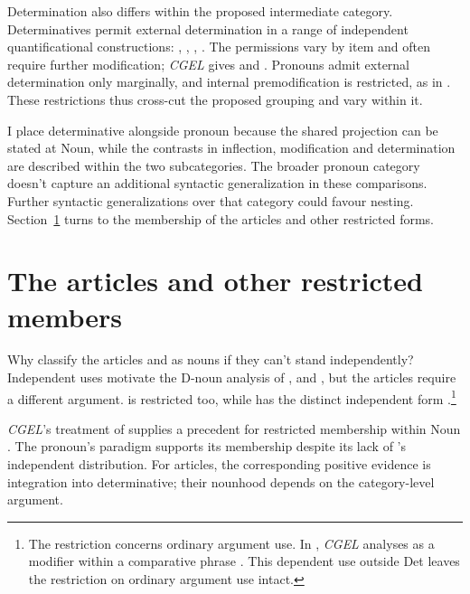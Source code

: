 \documentclass[12pt]{article}
\begin{document}
Determination also differs within the proposed intermediate category. Determinatives permit external determination in a range of independent quantificational constructions: , , , . The permissions vary by item and often require further modification; \textit{CGEL} gives  and  \citep[415--416]{huddleston2002}. Pronouns admit external determination only marginally, and internal premodification is restricted, as in  \citep[429--430]{huddleston2002}. These restrictions thus cross-cut the proposed grouping and vary within it.

I place determinative alongside pronoun because the shared projection can be stated at Noun, while the contrasts in inflection, modification and determination are described within the two subcategories. The broader pronoun category doesn't capture an additional syntactic generalization in these comparisons. Further syntactic generalizations over that category could favour nesting. Section~\ref{sec:articles} turns to the membership of the articles and other restricted forms.

\section{The articles and other restricted members}\label{sec:articles}

Why classify the articles  and  as nouns if they can't stand independently? Independent uses motivate the D-noun analysis of ,  and , but the articles require a different argument.  is restricted too, while  has the distinct independent form  \citep[371--372, 410--411]{huddleston2002}.\footnote{The restriction concerns ordinary argument use. In , \textit{CGEL} analyses  as a modifier within a comparative phrase \citep[1131--1132, 1135--1136]{huddleston2002}. This dependent use outside Det leaves the restriction on ordinary argument use intact.}

\textit{CGEL}'s treatment of  supplies a precedent for restricted membership within Noun \citep[470--471]{huddleston2002}. The pronoun's paradigm supports its membership despite its lack of 's independent distribution. For articles, the corresponding positive evidence is integration into determinative; their nounhood depends on the category-level argument.
\end{document}
